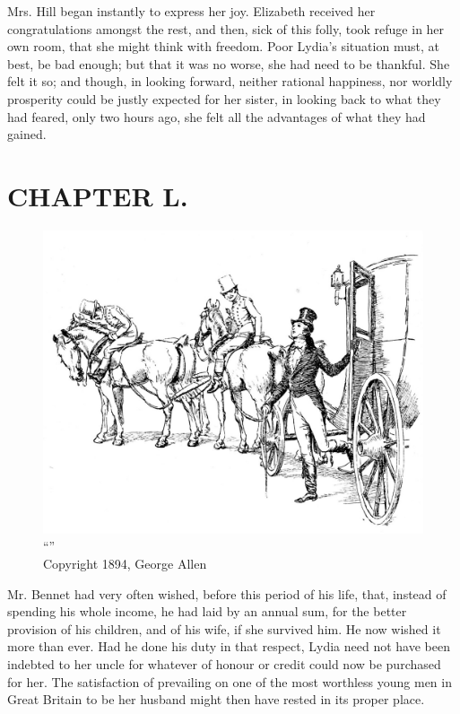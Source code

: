 Mrs. Hill began instantly to express her joy. Elizabeth received her congratulations amongst the rest, and then, sick of this folly, took refuge in her own room, that she might think with freedom. Poor Lydia's situation must, at best, be bad enough; but that it was no worse, she had need to be thankful. She felt it so; and though, in looking forward, neither rational happiness, nor worldly prosperity could be justly expected for her sister, in looking back to what they had feared, only two hours ago, she felt all the advantages of what they had gained.



\chapter{CHAPTER L.}

\begin{figure}[htbp]
    \centering
    \includegraphics[width=\textwidth]{illustrations/i_031.jpg}
    \caption{“”\\ Copyright 1894, George Allen}
    \label{fig:image}
\end{figure}


Mr. Bennet had very often wished, before this period of his life, that, instead of spending his whole income, he had laid by an annual sum, for the better provision of his children, and of his wife, if she survived him. He now wished it more than ever. Had he done his duty in that respect, Lydia need not have been indebted to her uncle for whatever of honour or credit could now be purchased for her. The satisfaction of prevailing on one of the most worthless young men in Great Britain to be her husband might then have rested in its proper place.

